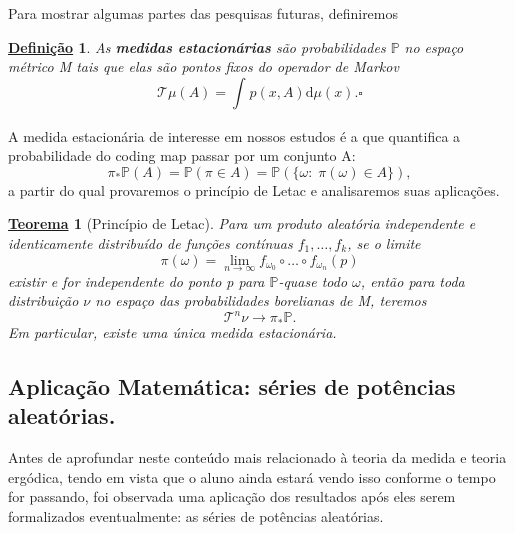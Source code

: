 \documentclass[12pt]{article}
\newtheorem*{def*}{\underline{Definição}}
\newtheorem*{theorem*}{\underline{Teorema}}
\theoremstyle{definition}
\begin{document}
Para mostrar algumas partes das pesquisas futuras, definiremos
\begin{def*}
	As \textbf{medidas estacionárias} são probabilidades \(\mathbb{P}\) no espaço métrico M tais que elas são pontos fixos do operador de Markov
	\[
		\mathcal{T}\mu (A) = \int_{}^{}p(x, A) \mathrm{d}\mu(x). \square
	\]
\end{def*}
A medida estacionária de interesse em nossos estudos é a que quantifica a probabilidade do coding map passar por um conjunto A:
\[
	\pi_{*}\mathbb{P}(A) = \mathbb{P}(\pi \in A) = \mathbb{P}(\{\omega:\; \pi (\omega )\in A\}),
\]
a partir do qual provaremos o princípio de Letac e analisaremos suas aplicações.
\begin{theorem*}[Princípio de Letac]
	Para um produto aleatória independente e identicamente distribuído de funções contínuas \(f_1, \dotsc , f_{k}\), se o limite
	\[
		\pi (\omega ) = \lim_{n\to \infty}f_{\omega_{0}}\circ \dotsc \circ f_{\omega_{n}}(p)
	\]
	existir e for independente do ponto p para \(\mathbb{P}\)-quase todo \(\omega \), então para toda distribuição \(\nu \) no espaço das probabilidades borelianas de M, teremos
	\[
		\mathcal{T}^{n}\nu \to \pi_{*}\mathbb{P}.
	\]
	Em particular, existe uma única medida estacionária.
\end{theorem*}

\subsection*{Aplicação Matemática: séries de potências aleatórias.}
Antes de aprofundar neste conteúdo mais relacionado à teoria da medida e teoria ergódica, tendo em vista que o aluno ainda estará vendo isso conforme o tempo for passando, foi observada uma aplicação dos resultados após eles serem formalizados eventualmente: as séries de potências aleatórias.
\end{document}
